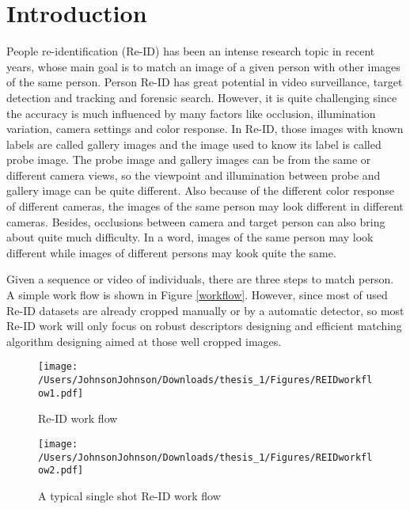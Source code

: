\chapter{Introduction}

People re-identification (Re-ID) has been an intense research topic in recent years, whose main goal is to match an image of a given person with other images of the same person. Person Re-ID has great potential in video surveillance, target detection and tracking and forensic search. However, it is quite challenging since the accuracy is much influenced by many factors like occlusion, illumination variation, camera settings and color response. In Re-ID, those images with known labels are called gallery images and the image used to know its label is called probe image. The probe image and gallery images can be from the same or different camera views, so the viewpoint and illumination between probe and gallery image can be quite different. Also because of the different color response of different cameras, the images of the same person may look different in different cameras. Besides, occlusions between camera and target person can also bring about quite much difficulty.  In a word, images of the same person may look different while images of different persons may kook quite the same. 

Given a sequence or video of individuals, there are three steps to match person. A simple work flow is shown in Figure \ref{workflow}. However, since most of used Re-ID datasets are already cropped manually or by a automatic detector, so most Re-ID work will only focus on robust descriptors designing and efficient matching algorithm designing aimed at those well cropped images. 


\begin{figure}[H]
\centering
\texttt{[image: /Users/JohnsonJohnson/Downloads/thesis\_1/Figures/REIDworkflow1.pdf]}
\vspace{1em}
\caption{Re-ID work flow}
\end{figure}
\label{workflow}

\begin{figure}[H]
\centering
\texttt{[image: /Users/JohnsonJohnson/Downloads/thesis\_1/Figures/REIDworkflow2.pdf]}
\vspace{1em}
\caption{A typical single shot Re-ID work flow}
\end{figure}




